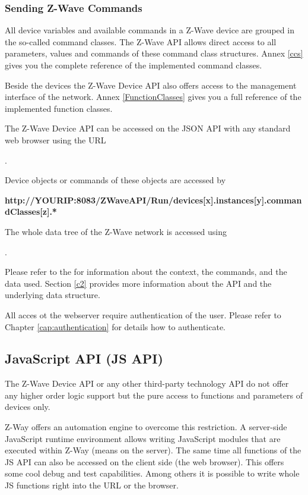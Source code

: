 \subsubsection {Sending Z-Wave Commands}

All device variables and available commands in a Z-Wave device are grouped in the so-called 
command classes. The Z-Wave API allows direct access to all parameters, values and commands 
of these command class structures. Annex \ref{ccs} gives you the complete reference of 
the implemented command classes.

Beside the devices the Z-Wave Device API also offers access to the management interface of 
the network. Annex \ref{FunctionClasses} gives you a full reference of the implemented 
function classes.

The Z-Wave Device API can be accessed on the JSON API with any standard web browser using the URL

.

Device objects or commands of these objects are accessed by



\textbf{http://YOURIP:8083/ZWaveAPI/Run/devices[x].instances[y].commandClasses[z].*}

The whole data tree of the Z-Wave network is accessed using


.

Please refer to the \zway for information about the context, the 
commands, and the data used. Section \ref{c2} provides more information
about the API and the underlying data structure.

All acces ot the webserver require authentication of the user. Please refer to Chapter 
\ref{cap:authentication} for details how to authenticate.

\subsection{JavaScript API (JS API)}

The Z-Wave Device API or any other third-party technology API do not offer any higher order
logic support but the pure access to functions and parameters of devices only.

Z-Way offers an automation engine to overcome this restriction. A server-side JavaScript 
runtime environment allows writing JavaScript modules that are executed within Z-Way 
(means on the server). The same time all functions of the JS API can also be accessed on 
the client side (the web browser). This offers some cool debug and test capabilities. 
Among others it is possible to write whole JS functions right into the URL or the browser.

